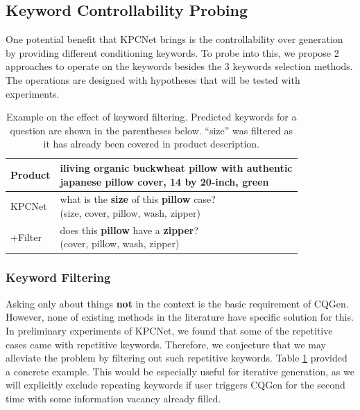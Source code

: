 \subsection{Keyword Controllability Probing}
\label{sec:probing}

One potential benefit that KPCNet brings is the controllability over 
generation by providing different conditioning keywords. To probe into this, 
we propose 2 approaches to operate on the keywords besides the 3 keywords 
selection methods. The operations are designed with hypotheses that 
will be tested with experiments.

\begin{table}[th]
  \small
  \centering
\begin{tabular}{l|l}
\hline
Product & \makecell[l]{iliving organic buckwheat pillow with authentic \\ japanese pillow cover, 14 by 20-inch, green } \\
\hline
KPCNet & \makecell[l]{what is the \textbf{size} of this \textbf{pillow} case? \\ (size, cover, pillow, wash, zipper)} \\
+Filter        & \makecell[l]{does this \textbf{pillow} have a \textbf{zipper}? \\ (cover, pillow, wash, zipper)} \\
\hline
\end{tabular}
\caption{\label{tab:kwd-filter} Example on the effect of keyword filtering. Predicted keywords for a question are shown in the parentheses below. ``size'' was filtered as it has already been covered in product description.}
\end{table}

\subsubsection{Keyword Filtering} \label{para:filter} Asking only about
things \textbf{not} in the context is the basic requirement of CQGen. 
However, none of existing methods in the literature 
have specific solution for this. In preliminary experiments of KPCNet, 
we found that some of the repetitive cases came with repetitive keywords.
Therefore, we conjecture that we may alleviate the problem by filtering 
out such repetitive keywords. Table \ref{tab:kwd-filter} provided a 
concrete example. This would be especially useful for iterative generation, 
as we will explicitly exclude repeating keywords if user triggers CQGen 
for the second time with some information vacancy already filled.


